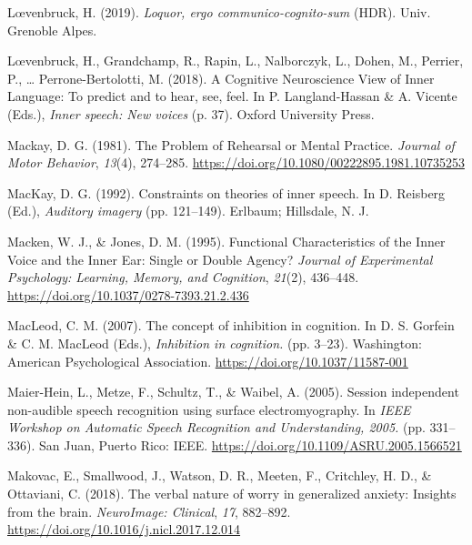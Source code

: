 \documentclass[a4paper,12pt,twoside,onecolumn,openright,final,oldfontcommands]{memoir}
\begin{document}
\leavevmode\hypertarget{ref-loevenbruck_loquor_2019}{}%
Lœvenbruck, H. (2019). \emph{Loquor, ergo communico-cognito-sum} (HDR). Univ. Grenoble Alpes.

\leavevmode\hypertarget{ref-loevenbruck_cognitive_2018}{}%
Lœvenbruck, H., Grandchamp, R., Rapin, L., Nalborczyk, L., Dohen, M., Perrier, P., \ldots{} Perrone-Bertolotti, M. (2018). A Cognitive Neuroscience View of Inner Language: To predict and to hear, see, feel. In P. Langland-Hassan \& A. Vicente (Eds.), \emph{Inner speech: New voices} (p. 37). Oxford University Press.

\leavevmode\hypertarget{ref-mackay_problem_1981}{}%
Mackay, D. G. (1981). The Problem of Rehearsal or Mental Practice. \emph{Journal of Motor Behavior}, \emph{13}(4), 274--285. \url{https://doi.org/10.1080/00222895.1981.10735253}

\leavevmode\hypertarget{ref-mackay_constraints_1992}{}%
MacKay, D. G. (1992). Constraints on theories of inner speech. In D. Reisberg (Ed.), \emph{Auditory imagery} (pp. 121--149). Erlbaum; Hillsdale, N. J.

\leavevmode\hypertarget{ref-macken_functional_1995}{}%
Macken, W. J., \& Jones, D. M. (1995). Functional Characteristics of the Inner Voice and the Inner Ear: Single or Double Agency? \emph{Journal of Experimental Psychology: Learning, Memory, and Cognition}, \emph{21}(2), 436--448. \url{https://doi.org/10.1037/0278-7393.21.2.436}

\leavevmode\hypertarget{ref-gorfein_concept_2007}{}%
MacLeod, C. M. (2007). The concept of inhibition in cognition. In D. S. Gorfein \& C. M. MacLeod (Eds.), \emph{Inhibition in cognition.} (pp. 3--23). Washington: American Psychological Association. \url{https://doi.org/10.1037/11587-001}

\leavevmode\hypertarget{ref-maier-hein_session_2005}{}%
Maier-Hein, L., Metze, F., Schultz, T., \& Waibel, A. (2005). Session independent non-audible speech recognition using surface electromyography. In \emph{IEEE Workshop on Automatic Speech Recognition and Understanding, 2005.} (pp. 331--336). San Juan, Puerto Rico: IEEE. \url{https://doi.org/10.1109/ASRU.2005.1566521}

\leavevmode\hypertarget{ref-makovac_verbal_2018}{}%
Makovac, E., Smallwood, J., Watson, D. R., Meeten, F., Critchley, H. D., \& Ottaviani, C. (2018). The verbal nature of worry in generalized anxiety: Insights from the brain. \emph{NeuroImage: Clinical}, \emph{17}, 882--892. \url{https://doi.org/10.1016/j.nicl.2017.12.014}
\end{document}
